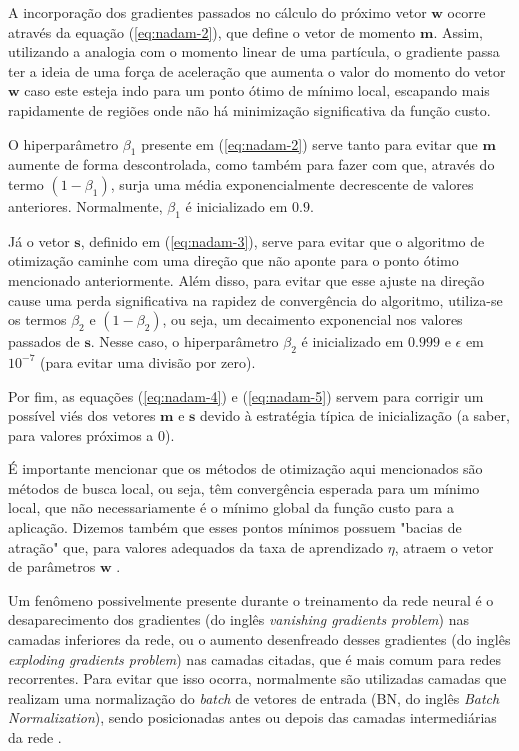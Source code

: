 \documentclass[a4paper, 12pt]{article}
\begin{document}
A incorporação dos gradientes passados no cálculo do próximo vetor $\mathbf{w}$ ocorre através da equação (\ref{eq:nadam-2}), que define o vetor de momento $\mathbf{m}$. Assim, utilizando a analogia com o momento linear de uma partícula, o gradiente passa ter a ideia de uma força de aceleração que aumenta o valor do momento do vetor $\mathbf{w}$ caso este esteja indo para um ponto ótimo de mínimo local, escapando mais rapidamente de regiões onde não há minimização significativa da função custo.

O hiperparâmetro $\beta_1$ presente em (\ref{eq:nadam-2}) serve tanto para evitar que $\mathbf{m}$ aumente de forma descontrolada, como também para fazer com que, através do termo $(1 - \beta_1)$, surja uma média exponencialmente decrescente de valores anteriores. Normalmente, $\beta_1$ é inicializado em $0.9$.

Já o vetor $\mathbf{s}$, definido em (\ref{eq:nadam-3}), serve para evitar que o algoritmo de otimização caminhe com uma direção que não aponte para o ponto ótimo mencionado anteriormente. Além disso, para evitar que esse ajuste na direção cause uma perda significativa na rapidez de convergência do algoritmo, utiliza-se os termos $\beta_2$ e $(1 - \beta_2)$, ou seja, um decaimento exponencial nos valores passados de $\mathbf{s}$. Nesse caso, o hiperparâmetro $\beta_2$ é inicializado em $0.999$ e $\epsilon$ em $10^{-7}$ (para evitar uma divisão por zero).

Por fim, as equações (\ref{eq:nadam-4}) e (\ref{eq:nadam-5}) servem para corrigir um possível viés dos vetores $\mathbf{m}$ e $\mathbf{s}$ devido à estratégia típica de inicialização (a saber, para valores próximos a $0$). 

É importante mencionar que os métodos de otimização aqui mencionados são métodos de busca local, ou seja, têm convergência esperada para um mínimo local, que não necessariamente é o mínimo global da função custo para a aplicação. Dizemos também que esses pontos mínimos possuem "bacias de atração" que, para valores adequados da taxa de aprendizado $\eta$, atraem o vetor de parâmetros $\mathbf{w}$ \cite{hastie2009elements}.

Um fenômeno possivelmente presente durante o treinamento da rede neural é o desaparecimento dos gradientes (do inglês \textit{vanishing gradients problem}) nas camadas inferiores da rede, ou o aumento desenfreado desses gradientes (do inglês \textit{exploding gradients problem}) nas camadas citadas, que é mais comum para redes recorrentes. Para evitar que isso ocorra, normalmente são utilizadas camadas que realizam uma normalização do \textit{batch} de vetores de entrada (BN, do inglês \textit{Batch Normalization}), sendo posicionadas antes ou depois das camadas intermediárias da rede \cite{geron2019hands}.
\end{document}
